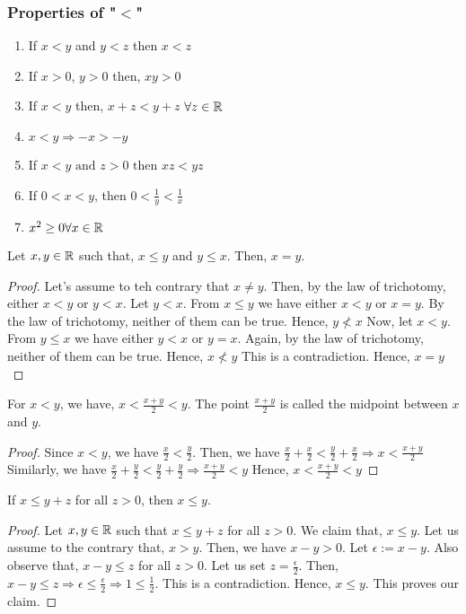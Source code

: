 \documentclass{scrartcl}
\begin{document}
    \subsubsection{Properties of "$<$"}
    \begin{enumerate}[label={(\roman*)}]
        \item If $x < y$ and $y < z$ then $x < z$
        \item If $x > 0$, $y>0$ then, $xy >0$
        \item If $x < y$ then, $x + z < y +z$ $\forall z \in \mathbb{R}$
        \item $x < y \Rightarrow -x > -y$
        \item If $x < y \text{ and } z > 0 \text{ then } xz < yz$
        \item If $0<x<y$, then $0<\frac{1}{y}<\frac{1}{x}$
        \item $x^2 \geq 0 \forall x \in \mathbb{R}$
    \end{enumerate}
    \begin{remark}
        Let $x, y \in \mathbb{R}$ such that, $x \leq y$ and $y \leq x$. Then, $x=y$. 
        \begin{proof}
            Let's assume to teh contrary that $x \neq y$. Then, by the law of trichotomy, either $x < y$ or $y < x$.
            Let $y < x$. From $x \leq y$ we have either $x < y$ or $x = y$. By the law of trichotomy, neither of them can be true. Hence, $y \nless x$
            Now, let $x < y$. From $y \leq x$ we have either $y < x$ or $y = x$. Again, by the law of trichotomy, neither of them can be true. Hence, $x \nless y$
            This is a contradiction. Hence, $x = y$
        \end{proof}
    \end{remark}
	\begin{example}
        For $x<y$, we have, $x<\frac{x+y}{2}<y$. The point $\frac{x + y}{2}$ is called the midpoint between $x$ and $y$.
        \begin{proof}
            Since $x < y$, we have $\frac{x}{2} < \frac{y}{2}$. Then, we have $\frac{x}{2} + \frac{x}{2} < \frac{y}{2} + \frac{x}{2} \Rightarrow x < \frac{x + y}{2}$
		    Similarly, we have $\frac{x}{2} + \frac{y}{2} < \frac{y}{2} + \frac{y}{2}\Rightarrow \frac{x + y}{2} < y$
            Hence, $x < \frac{x + y}{2} < y$
        \end{proof}
	\end{example}
    \begin{example}
        If $x \leq y + z$ for all $z > 0$, then $x \leq y$.
        \begin{proof}
            Let $x,y \in \mathbb{R}$ such that $x \leq y + z$ for all $z > 0$. We claim that, $x \leq y$. Let us assume to the contrary that, $x > y$. Then, we have $x - y > 0$. Let $\epsilon := x - y$. Also observe that, $x-y \leq z$ for all $z > 0$. Let us set $z = \frac{\epsilon}{2}$. Then, $x - y \leq z \Rightarrow \epsilon \leq \frac{\epsilon}{2} \Rightarrow 1 \leq \frac{1}{2}$. This is a contradiction. Hence, $x \leq y$. This proves our claim.
        \end{proof}
    \end{example}
\end{document}
